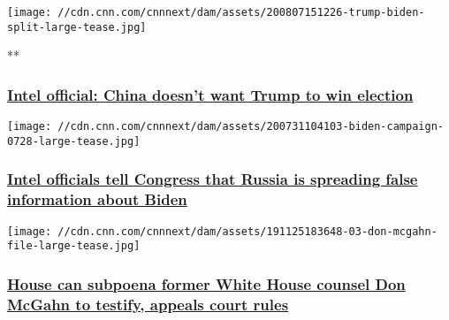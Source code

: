 \href{/videos/politics/2020/08/07/2020-election-russia-china-iran-perez-sot-nr-vpx.cnn}{}

\texttt{[image: //cdn.cnn.com/cnnnext/dam/assets/200807151226-trump-biden-split-large-tease.jpg]}

**

\hypertarget{intel-official-china-doesnt-want-trump-to-win-election}{%
\subsubsection{\texorpdfstring{\href{/videos/politics/2020/08/07/2020-election-russia-china-iran-perez-sot-nr-vpx.cnn}{Intel
official: China doesn't want Trump to win
election}}{Intel official: China doesn't want Trump to win election}}\label{intel-official-china-doesnt-want-trump-to-win-election}}

\href{/2020/08/07/politics/us-intelligence-russia-election-interference-biden/index.html}{}

\texttt{[image: //cdn.cnn.com/cnnnext/dam/assets/200731104103-biden-campaign-0728-large-tease.jpg]}

\hypertarget{intel-officials-tell-congress-that-russia-is-spreading-false-information-about-biden}{%
\subsubsection{\texorpdfstring{\href{/2020/08/07/politics/us-intelligence-russia-election-interference-biden/index.html}{Intel
officials tell Congress that Russia is spreading false information about
Biden}}{Intel officials tell Congress that Russia is spreading false information about Biden}}\label{intel-officials-tell-congress-that-russia-is-spreading-false-information-about-biden}}

\href{/2020/08/07/politics/don-mcgahn-subpoena/index.html}{}

\texttt{[image: //cdn.cnn.com/cnnnext/dam/assets/191125183648-03-don-mcgahn-file-large-tease.jpg]}

\hypertarget{house-can-subpoena-former-white-house-counsel-don-mcgahn-to-testify-appeals-court-rules}{%
\subsubsection{\texorpdfstring{\href{/2020/08/07/politics/don-mcgahn-subpoena/index.html}{House
can subpoena former White House counsel Don McGahn to testify, appeals
court
rules}}{House can subpoena former White House counsel Don McGahn to testify, appeals court rules}}\label{house-can-subpoena-former-white-house-counsel-don-mcgahn-to-testify-appeals-court-rules}}

